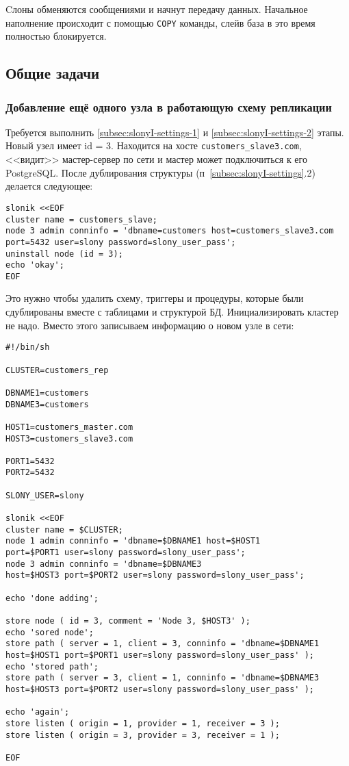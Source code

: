 Cлоны обменяются сообщениями и начнут передачу данных. Начальное наполнение происходит с помощью \lstinline!COPY! команды, слейв база в это время полностью блокируется.

\subsection{Общие задачи}

\subsubsection{Добавление ещё одного узла в работающую схему репликации}

Требуется выполнить \ref{subsec:slonyI-settings-1} и \ref{subsec:slonyI-settings-2} этапы. Новый узел имеет id = 3. Находится на хосте \lstinline!customers_slave3.com!, <<видит>> мастер-сервер по сети и мастер может подключиться к его PostgreSQL. После дублирования структуры (п~\ref{subsec:slonyI-settings}.2) делается следующее:

\begin{lstlisting}[label=lst:slony13,caption=Общие задачи]
slonik <<EOF
cluster name = customers_slave;
node 3 admin conninfo = 'dbname=customers host=customers_slave3.com
port=5432 user=slony password=slony_user_pass';
uninstall node (id = 3);
echo 'okay';
EOF
\end{lstlisting}

Это нужно чтобы удалить схему, триггеры и процедуры, которые были сдублированы вместе с таблицами и структурой БД. Инициализировать кластер не надо. Вместо этого записываем информацию о новом узле в сети:

\begin{lstlisting}[label=lst:slony14,caption=Общие задачи]
#!/bin/sh

CLUSTER=customers_rep

DBNAME1=customers
DBNAME3=customers

HOST1=customers_master.com
HOST3=customers_slave3.com

PORT1=5432
PORT2=5432

SLONY_USER=slony

slonik <<EOF
cluster name = $CLUSTER;
node 1 admin conninfo = 'dbname=$DBNAME1 host=$HOST1
port=$PORT1 user=slony password=slony_user_pass';
node 3 admin conninfo = 'dbname=$DBNAME3
host=$HOST3 port=$PORT2 user=slony password=slony_user_pass';

echo 'done adding';

store node ( id = 3, comment = 'Node 3, $HOST3' );
echo 'sored node';
store path ( server = 1, client = 3, conninfo = 'dbname=$DBNAME1
host=$HOST1 port=$PORT1 user=slony password=slony_user_pass' );
echo 'stored path';
store path ( server = 3, client = 1, conninfo = 'dbname=$DBNAME3
host=$HOST3 port=$PORT2 user=slony password=slony_user_pass' );

echo 'again';
store listen ( origin = 1, provider = 1, receiver = 3 );
store listen ( origin = 3, provider = 3, receiver = 1 );

EOF
\end{lstlisting}

